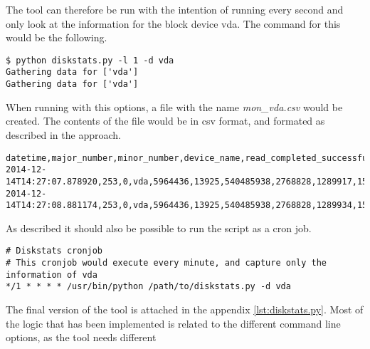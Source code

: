 The tool can therefore be run with the intention of running every second and
only look at the information for the block device vda. The command for this
would be the following.

\begin{center}
\begin{lstlisting}[label=lst:,caption=Execution of disksts.py,numbers=none]
$ python diskstats.py -l 1 -d vda
Gathering data for ['vda']
Gathering data for ['vda']
\end{lstlisting}
\end{center}

When running with this options, a file with the name \textit{mon\_vda.csv} would
be created. The contents of the file would be in csv format, and formated as
described in the approach.

\begin{center}
\begin{lstlisting}[label=lst:out_data,caption=Gathered data stored in file from
diskstst.py,numbers=none]
datetime,major_number,minor_number,device_name,read_completed_successfully,reads_merged,sectors_read,time_spent_reading(ms),writes_completed,writes_merged,sectors_written,time_spent_writing_(ms),IO_currently_in_progress,time_spent_doing_IO_(ms),weighted_time_spent_doing_IO
2014-12-14T14:27:07.878920,253,0,vda,5964436,13925,540485938,2768828,1289917,1519024,48384848,9417637,0,1382484,12180809
2014-12-14T14:27:08.881174,253,0,vda,5964436,13925,540485938,2768828,1289934,1519049,48385184,9417668,0,1382487,12180840
\end{lstlisting}
\end{center}

As described it should also be possible to run the script as a cron job.
\begin{center}
\begin{lstlisting}[label=lst:cronjob,caption=Cronjob example, numbers=none]
# Diskstats cronjob
# This cronjob would execute every minute, and capture only the information of vda
*/1 * * * * /usr/bin/python /path/to/diskstats.py -d vda
\end{lstlisting}
\end{center}

The final version of the tool is attached in the appendix
\vref{lst:diskstats.py}. Most of the logic that has been implemented is related
to the different command line options, as the tool needs different 

